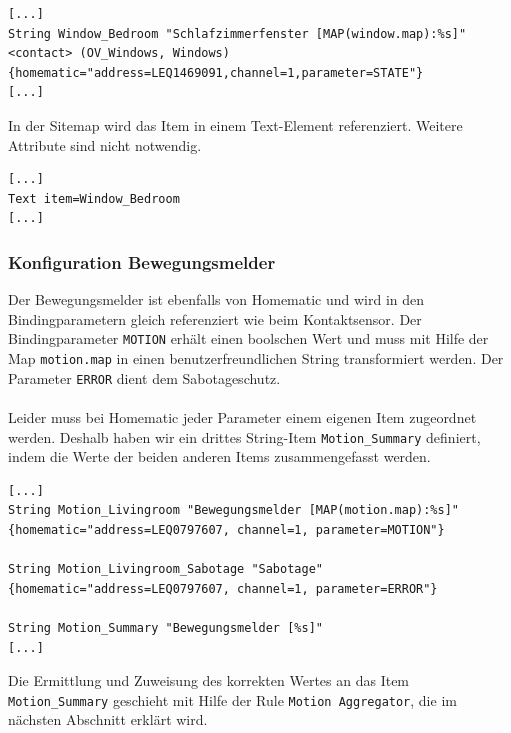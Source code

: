 \begin{lstlisting}[style=csharp, caption=demo.items - Kontaktsensor]
[...]
String Window_Bedroom "Schlafzimmerfenster [MAP(window.map):%s]"
<contact> (OV_Windows, Windows)
{homematic="address=LEQ1469091,channel=1,parameter=STATE"}
[...]
\end{lstlisting}

In der Sitemap wird das Item in einem Text-Element referenziert. Weitere Attribute sind nicht notwendig.

\begin{lstlisting}[style=csharp, caption=demo.sitemap - Kontaktsensor]
[...]
Text item=Window_Bedroom
[...]
\end{lstlisting}

\subsubsection{Konfiguration Bewegungsmelder}
Der Bewegungsmelder ist ebenfalls von Homematic und wird in den Bindingparametern gleich referenziert wie beim Kontaktsensor. Der Bindingparameter \lstinline!MOTION! erhält einen boolschen Wert und muss mit Hilfe der Map \lstinline!motion.map! in einen benutzerfreundlichen String transformiert werden. Der Parameter \lstinline!ERROR! dient dem Sabotageschutz.\\ \\
Leider muss bei Homematic jeder Parameter einem eigenen Item zugeordnet werden. Deshalb haben wir ein drittes String-Item \lstinline!Motion_Summary! definiert, indem die Werte der beiden anderen Items zusammengefasst werden. 


\begin{lstlisting}[style=csharp, caption=demo.items - Bewegungsmelder Items]
[...]
String Motion_Livingroom "Bewegungsmelder [MAP(motion.map):%s]"
{homematic="address=LEQ0797607, channel=1, parameter=MOTION"}

String Motion_Livingroom_Sabotage "Sabotage"
{homematic="address=LEQ0797607, channel=1, parameter=ERROR"}

String Motion_Summary "Bewegungsmelder [%s]"
[...]
\end{lstlisting}

Die Ermittlung und Zuweisung des korrekten Wertes an das Item \lstinline!Motion_Summary! geschieht mit Hilfe der Rule \lstinline!Motion Aggregator!, die im nächsten Abschnitt erklärt wird.

